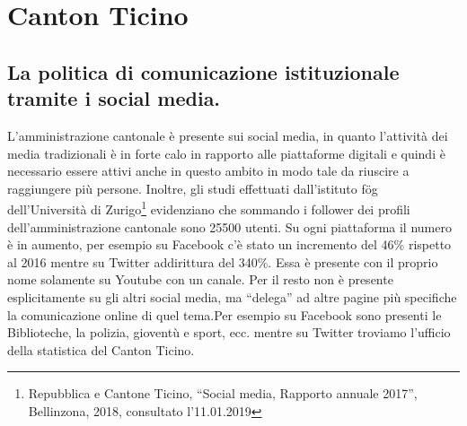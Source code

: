 \section{Canton Ticino}
\subsection{La politica di comunicazione istituzionale tramite i social media.}
L’amministrazione cantonale è presente sui social media, in quanto l’attività dei media tradizionali è in forte calo in rapporto alle piattaforme digitali e quindi è necessario essere attivi anche in questo ambito in modo tale da riuscire a raggiungere più persone. Inoltre, gli studi effettuati dall’istituto fög dell’Università di Zurigo\footnote{Repubblica e Cantone Ticino, “Social media, Rapporto annuale 2017”, Bellinzona, 2018, consultato l’11.01.2019} evidenziano che sommando i follower dei profili dell’amministrazione cantonale sono 25500 utenti. Su ogni piattaforma il numero è in aumento, per esempio su Facebook c’è stato un incremento del 46\% rispetto al 2016 mentre su Twitter addirittura del 340\%. Essa è presente con il proprio nome solamente su Youtube con un canale. Per il resto non è presente esplicitamente su gli altri social media, ma “delega” ad altre pagine più specifiche la comunicazione online di quel tema.Per esempio su Facebook sono presenti le Biblioteche, la polizia, gioventù e sport, ecc. mentre su Twitter troviamo l’ufficio della statistica del Canton Ticino. 
\newpage
